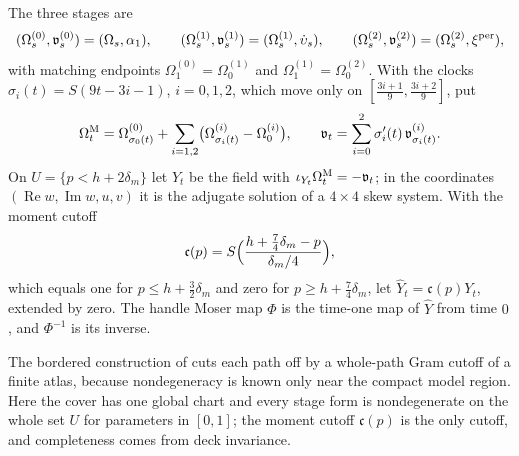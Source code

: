 \begin{construction}\label{cons:shd4-moser}
The three stages are
\[
 (\Omega^{(0)}_s,\mathfrak v^{(0)}_s)=(\Omega_s,\alpha_1),\qquad
 (\Omega^{(1)}_s,\mathfrak v^{(1)}_s)=(\Omega^{(1)}_s,\dot\upsilon_s),\qquad
 (\Omega^{(2)}_s,\mathfrak v^{(2)}_s)=(\Omega^{(2)}_s,\xi^{\rm per}),
\]
with matching endpoints $\Omega^{(0)}_1=\Omega^{(1)}_0$ and $\Omega^{(1)}_1=\Omega^{(2)}_0$. With the clocks $\sigma_i(t)=S(9t-3i-1)$,
$i=0,1,2$, which move only on $[\frac{3i+1}9,\frac{3i+2}9]$, put
\[
 \Omega^{\rm M}_t=\Omega^{(0)}_{\sigma_0(t)}+\sum_{i=1,2}\bigl(\Omega^{(i)}_{\sigma_i(t)}-\Omega^{(i)}_0\bigr),\qquad
 \mathfrak v_t=\sum_{i=0}^2\sigma_i'(t)\,\mathfrak v^{(i)}_{\sigma_i(t)} .
\]
On $U=\{p<h+2\delta_m\}$ let $Y_t$ be the field with $\iota_{Y_t}\Omega^{\rm M}_t=-\mathfrak v_t$; in the coordinates
$(\operatorname{Re}w,\operatorname{Im}w,u,v)$ it is the adjugate solution of a $4\times4$ skew system. With the moment cutoff
\[
 \mathfrak c(p)=S\Bigl(\frac{h+\frac74\delta_m-p}{\delta_m/4}\Bigr),
\]
which equals one for $p\le h+\frac32\delta_m$ and zero for $p\ge h+\frac74\delta_m$, let $\widehat Y_t=\mathfrak c(p)Y_t$, extended by zero.
The handle Moser map $\Phi$ is the time-one map of $\widehat Y$ from time $0$, and $\Phi^{-1}$ is its inverse.
\end{construction}

The bordered construction of  cuts each path off by a whole-path Gram cutoff of a finite atlas,
because nondegeneracy is known only near the compact model region. Here the cover has one global chart and every stage
form is nondegenerate on the whole set $U$ for parameters in $[0,1]$; the moment cutoff $\mathfrak c(p)$ is the only cutoff, and
completeness comes from deck invariance.


